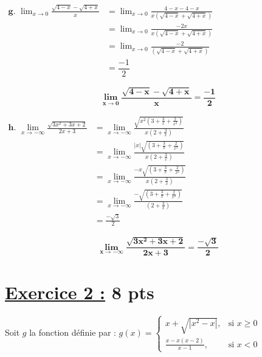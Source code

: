 \documentclass[12pt,a4paper]{article}
\begin{document}
\(
\begin{aligned}
\textbf{g. }\lim_{x \to 0} \frac{\sqrt{4 - x} - \sqrt{4 + x}}{x} &= \lim_{x \to 0} \frac{4 - x - 4 - x}{x\left(\sqrt{4 - x} + \sqrt{4 + x}\right)}\\
																																 &= \lim_{x \to 0} \frac{-2x}{x\left(\sqrt{4 - x} + \sqrt{4 + x}\right)}\\
																																 &= \lim_{x \to 0} \frac{-2}{\left(\sqrt{4 - x} + \sqrt{4 + x}\right)}\\
																																 &= \dfrac{-1}{2}
\end{aligned}
\)

									  \begin{resultbox}
                        \[
                            \mathbf{ \lim_{x \to 0} \frac{\sqrt{4 - x} - \sqrt{4 + x}}{x} = \frac{-1}{2} }
                        \]
                    \end{resultbox}	
                    
\(
\begin{aligned}
\textbf{h. }\lim\limits_{x \to -\infty} \frac{\sqrt{3x^2 + 3x + 2}}{2x + 3} &= \lim\limits_{x \to -\infty} \frac{\sqrt{x^{2}\left(3 + \frac{3}{x} + \frac{2}{x^{2}}\right)}}{x\left(2 + \frac{3}{x} \right)}\\
																																						&= \lim\limits_{x \to -\infty} \frac{|x|\sqrt{\left(3 + \frac{3}{x} + \frac{2}{x^{2}}\right)}}{x\left(2 + \frac{3}{x} \right)}\\
																																						&= \lim\limits_{x \to -\infty} \frac{-x\sqrt{\left(3 + \frac{3}{x} + \frac{2}{x^{2}}\right)}}{x\left(2 + \frac{3}{x} \right)}\\
																																						&= \lim\limits_{x \to -\infty} \frac{-\sqrt{\left(3 + \frac{3}{x} + \frac{2}{x^{2}}\right)}}{\left(2 + \frac{3}{x} \right)}\\
																																						&=\frac{-\sqrt{3}}{2}
\end{aligned}
\)

									  \begin{resultbox}
                        \[
                            \mathbf{ \lim\limits_{x \to -\infty} \frac{\sqrt{3x^2 + 3x + 2}}{2x + 3} = \frac{-\sqrt{3}}{2} }
                        \]
                    \end{resultbox}	
                   
\section*{\underline{Exercice 2 :} 8 pts }
Soit \( g \) la fonction définie par :
\(
g(x) =
\begin{cases}
    x + \sqrt{|x^2 - x|},     & \text{si } x \geq 0 \\
    \frac{x - x(x-2)}{x - 1}, & \text{si } x < 0
\end{cases}
\)
\end{document}
